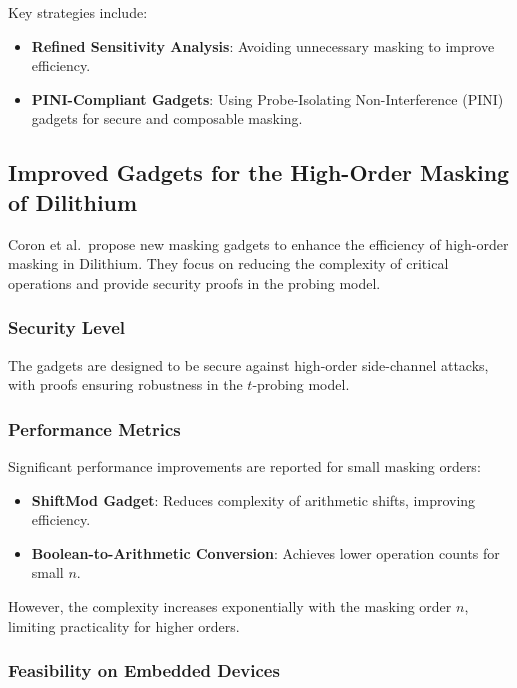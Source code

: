 Key strategies include:

\begin{itemize}
    \item \textbf{Refined Sensitivity Analysis}: Avoiding unnecessary masking to improve efficiency.
    \item \textbf{PINI-Compliant Gadgets}: Using Probe-Isolating Non-Interference (PINI) gadgets for secure and composable masking.
\end{itemize}

\subsection{Improved Gadgets for the High-Order Masking of Dilithium}

Coron et al.\ propose new masking gadgets to enhance the efficiency of high-order masking in Dilithium. They focus on reducing the complexity of critical operations and provide security proofs in the probing model.

\subsubsection{Security Level}

The gadgets are designed to be secure against high-order side-channel attacks, with proofs ensuring robustness in the $t$-probing model.

\subsubsection{Performance Metrics}

Significant performance improvements are reported for small masking orders:

\begin{itemize}
    \item \textbf{ShiftMod Gadget}: Reduces complexity of arithmetic shifts, improving efficiency.
    \item \textbf{Boolean-to-Arithmetic Conversion}: Achieves lower operation counts for small $n$.
\end{itemize}

However, the complexity increases exponentially with the masking order $n$, limiting practicality for higher orders.

\subsubsection{Feasibility on Embedded Devices}

